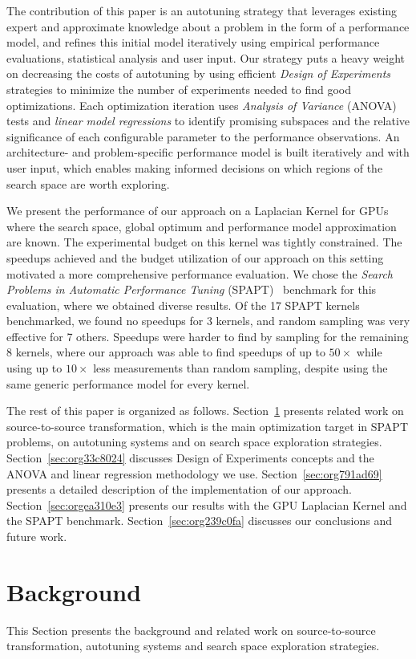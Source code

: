 \documentclass[conference]{IEEEtran}
\begin{document}
The contribution of this paper is an autotuning strategy that leverages existing
expert and approximate knowledge about a problem in the form of a performance
model, and refines this initial model iteratively using empirical performance
evaluations, statistical analysis and user input. Our strategy puts a heavy
weight on decreasing the costs of autotuning by using efficient \emph{Design of
Experiments} strategies to minimize the number of experiments needed to find
good optimizations. Each optimization iteration uses \emph{Analysis of Variance}
(ANOVA) tests and \emph{linear model regressions} to identify promising subspaces and
the relative significance of each configurable parameter to the performance
observations. An architecture- and problem-specific performance model is built
iteratively and with user input, which enables making informed decisions on
which regions of the search space are worth exploring.

We present the performance of our approach on a Laplacian Kernel for GPUs where
the search space, global optimum and performance model approximation are known.
The experimental budget on this kernel was tightly constrained. The speedups
achieved and the budget utilization of our approach on this setting motivated a
more comprehensive performance evaluation. We chose the \emph{Search Problems in
Automatic Performance Tuning} (SPAPT)~\cite{balaprakash2012spapt}
benchmark for this evaluation, where we obtained diverse results. Of the 17
SPAPT kernels benchmarked, we found no speedups for 3 kernels, and random
sampling was very effective for 7 others. Speedups were harder to find by
sampling for the remaining 8 kernels, where our approach was able to find
speedups of up to \(50\times\) while using up to \(10\times\) less measurements than
random sampling, despite using the same generic performance model for every
kernel.

The rest of this paper is organized as follows. Section~\ref{sec:orga845cda}
presents related work on source-to-source transformation, which is the main
optimization target in SPAPT problems, on autotuning systems and on search space
exploration strategies. Section~\ref{sec:org33c8024} discusses Design of
Experiments concepts and the ANOVA and linear regression methodology we use.
Section~\ref{sec:org791ad69} presents a detailed
description of the implementation of our approach. Section~\ref{sec:orgea310e3} presents our results with the GPU Laplacian Kernel and the SPAPT
benchmark. Section~\ref{sec:org239c0fa} discusses our conclusions and future work.
\section{Background}
\label{sec:orga845cda}
This Section presents the background and related work on source-to-source
transformation, autotuning systems and search space exploration strategies.
\end{document}
